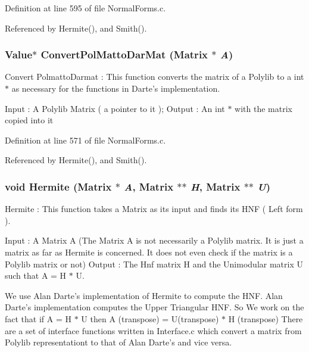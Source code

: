 Definition at line 595 of file Normal\-Forms.c.

Referenced by Hermite(), and Smith().

\subsubsection{\setlength{\rightskip}{0pt plus 5cm}Value$\ast$ Convert\-Pol\-Matto\-Dar\-Mat (Matrix $\ast$ {\em A})\hspace{0.3cm}{\tt  [static]}}\label{NormalForms_8c_a13}


Convert Polmatto\-Darmat : This function converts the matrix of a Polylib to a int $\ast$ as necessary for the functions in Darte's implementation.

Input : A Polylib Matrix ( a pointer to it ); Output : An int $\ast$ with the matrix copied into it 

Definition at line 571 of file Normal\-Forms.c.

Referenced by Hermite(), and Smith().

\subsubsection{\setlength{\rightskip}{0pt plus 5cm}void Hermite (Matrix $\ast$ {\em A}, Matrix $\ast$$\ast$ {\em H}, Matrix $\ast$$\ast$ {\em U})}\label{NormalForms_8c_a16}


Hermite : This function takes a Matrix as its input and finds its HNF ( Left form ).

Input : A Matrix A (The Matrix A is not necessarily a Polylib matrix. It is just a matrix as far as Hermite is concerned. It does not even check if the matrix is a Polylib matrix or not)  Output : The Hnf matrix H and the Unimodular matrix U such that A = H $\ast$ U.

We use Alan Darte's implementation of Hermite to compute the HNF. Alan Darte's implementation computes the Upper Triangular HNF. So We work on the fact that if A = H $\ast$ U then  A (transpose) = U(transpose) $\ast$ H (transpose) There are a set of interface functions written in Interface.c which convert a matrix from Polylib representationt to that of Alan Darte's and vice versa.

